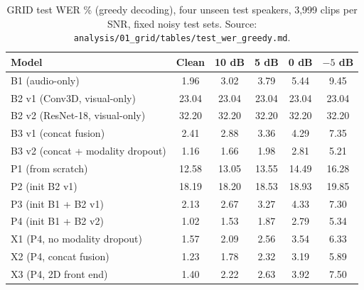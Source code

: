 
\begin{table}[htbp]
\centering
\caption{GRID test WER \% (greedy decoding), four unseen test speakers, 3,999 clips per SNR, fixed noisy test sets. Source: \texttt{analysis/01\_grid/tables/test\_wer\_greedy.md}.}
\label{tab:grid-wer-greedy}
\begin{tabular}{lccccc}
\toprule
Model & Clean & 10 dB & 5 dB & 0 dB & $-5$ dB \\
\midrule
B1 (audio-only) & 1.96 & 3.02 & 3.79 & 5.44 & 9.45 \\
B2 v1 (Conv3D, visual-only) & 23.04 & 23.04 & 23.04 & 23.04 & 23.04 \\
B2 v2 (ResNet-18, visual-only) & 32.20 & 32.20 & 32.20 & 32.20 & 32.20 \\
B3 v1 (concat fusion) & 2.41 & 2.88 & 3.36 & 4.29 & 7.35 \\
B3 v2 (concat + modality dropout) & 1.16 & 1.66 & 1.98 & 2.81 & 5.21 \\
P1 (from scratch) & 12.58 & 13.05 & 13.55 & 14.49 & 16.28 \\
P2 (init B2 v1) & 18.19 & 18.20 & 18.53 & 18.93 & 19.85 \\
P3 (init B1 + B2 v1) & 2.13 & 2.67 & 3.27 & 4.33 & 7.30 \\
P4 (init B1 + B2 v2) & 1.02 & 1.53 & 1.87 & 2.79 & 5.34 \\
X1 (P4, no modality dropout) & 1.57 & 2.09 & 2.56 & 3.54 & 6.33 \\
X2 (P4, concat fusion) & 1.23 & 1.78 & 2.32 & 3.19 & 5.89 \\
X3 (P4, 2D front end) & 1.40 & 2.22 & 2.63 & 3.92 & 7.50 \\
\bottomrule
\end{tabular}
\end{table}

